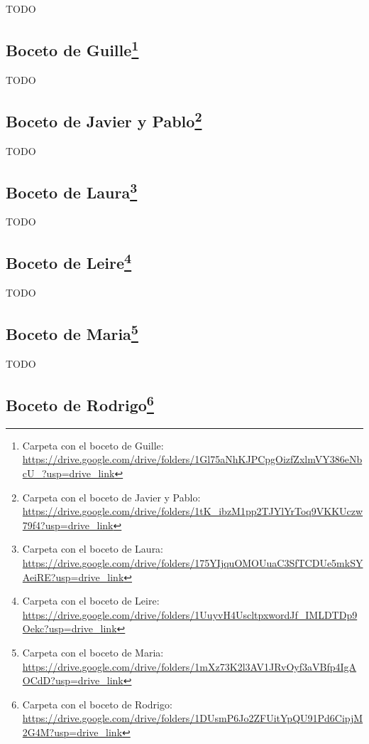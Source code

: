 TODO

\subsection[Boceto de Guille]{Boceto de Guille\footnote{Carpeta con el boceto de Guille: \url{https://drive.google.com/drive/folders/1Gl75aNhKJPCpgOizfZxlmVY386eNbcU_?usp=drive_link}}}

TODO

\subsection[Boceto de Javier y Pablo]{Boceto de Javier y Pablo\footnote{Carpeta con el boceto de Javier y Pablo: \url{https://drive.google.com/drive/folders/1tK_ibzM1pp2TJYlYrToq9VKKUczw79f4?usp=drive_link}}}

TODO

\subsection[Boceto de Laura]{Boceto de Laura\footnote{Carpeta con el boceto de Laura: \url{https://drive.google.com/drive/folders/175YIjquOMOUuaC3SfTCDUe5mkSYAeiRE?usp=drive_link}}}

TODO

\subsection[Boceto de Leire]{Boceto de Leire\footnote{Carpeta con el boceto de Leire: \url{https://drive.google.com/drive/folders/1UuyvH4UscltpxwordJf_IMLDTDp9Oekc?usp=drive_link}}}

TODO

\subsection[Boceto de Maria]{Boceto de Maria\footnote{Carpeta con el boceto de Maria: \url{https://drive.google.com/drive/folders/1mXz73K2l3AV1JRvOyf3aVBfp4IgAOCdD?usp=drive_link}}}

TODO

\subsection[Boceto de Rodrigo]{Boceto de Rodrigo\footnote{Carpeta con el boceto de Rodrigo: \url{https://drive.google.com/drive/folders/1DUsmP6Jo2ZFUitYpQU91Pd6CipjM2G4M?usp=drive_link}}}

